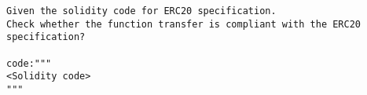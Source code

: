 \begin{lstlisting}[label={lst:exp-inst-st1},captionpos=b, caption={Example of prompt in instruction experiment setting-1},language=GPTPrompt]
Given the solidity code for ERC20 specification.
Check whether the function transfer is compliant with the ERC20 specification?

code:"""
<Solidity code>
"""
\end{lstlisting}
